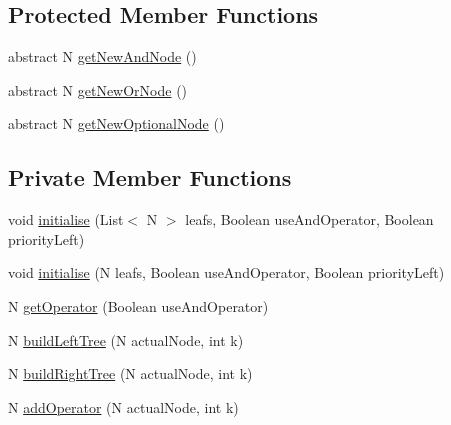 \subsection*{Protected Member Functions}
\begin{DoxyCompactItemize}
\item 
abstract N \hyperlink{classit_1_1emarolab_1_1cagg_1_1core_1_1PseudoBinaryNode_1_1PseudoBinaryTreeGenerator_3_01N_01extends_01PseudoBinaryNode_01_4_acda10a61fc91f76e47c9f49563facb58}{get\-New\-And\-Node} ()
\item 
abstract N \hyperlink{classit_1_1emarolab_1_1cagg_1_1core_1_1PseudoBinaryNode_1_1PseudoBinaryTreeGenerator_3_01N_01extends_01PseudoBinaryNode_01_4_ad040ce8e6b2f71fef3085d531810662a}{get\-New\-Or\-Node} ()
\item 
abstract N \hyperlink{classit_1_1emarolab_1_1cagg_1_1core_1_1PseudoBinaryNode_1_1PseudoBinaryTreeGenerator_3_01N_01extends_01PseudoBinaryNode_01_4_afbf62964b9e325ab04066b93ae0193f1}{get\-New\-Optional\-Node} ()
\end{DoxyCompactItemize}
\subsection*{Private Member Functions}
\begin{DoxyCompactItemize}
\item 
void \hyperlink{classit_1_1emarolab_1_1cagg_1_1core_1_1PseudoBinaryNode_1_1PseudoBinaryTreeGenerator_3_01N_01extends_01PseudoBinaryNode_01_4_a45f5619147f3f0d99121c67c72c3b3af}{initialise} (List$<$ N $>$ leafs, Boolean use\-And\-Operator, Boolean priority\-Left)
\item 
void \hyperlink{classit_1_1emarolab_1_1cagg_1_1core_1_1PseudoBinaryNode_1_1PseudoBinaryTreeGenerator_3_01N_01extends_01PseudoBinaryNode_01_4_adc79f9bbb248c0b5a116836affaa20b8}{initialise} (N leafs, Boolean use\-And\-Operator, Boolean priority\-Left)
\item 
N \hyperlink{classit_1_1emarolab_1_1cagg_1_1core_1_1PseudoBinaryNode_1_1PseudoBinaryTreeGenerator_3_01N_01extends_01PseudoBinaryNode_01_4_a8605ade19a0ffd011f6ef1c8496f1215}{get\-Operator} (Boolean use\-And\-Operator)
\item 
N \hyperlink{classit_1_1emarolab_1_1cagg_1_1core_1_1PseudoBinaryNode_1_1PseudoBinaryTreeGenerator_3_01N_01extends_01PseudoBinaryNode_01_4_a9a8843d16ae51f1d9c1573f60488f143}{build\-Left\-Tree} (N actual\-Node, int k)
\item 
N \hyperlink{classit_1_1emarolab_1_1cagg_1_1core_1_1PseudoBinaryNode_1_1PseudoBinaryTreeGenerator_3_01N_01extends_01PseudoBinaryNode_01_4_a8e31422ba0d9e1d5c1e9eceeefd48892}{build\-Right\-Tree} (N actual\-Node, int k)
\item 
N \hyperlink{classit_1_1emarolab_1_1cagg_1_1core_1_1PseudoBinaryNode_1_1PseudoBinaryTreeGenerator_3_01N_01extends_01PseudoBinaryNode_01_4_af40fd40f6f7b223449441ed627bb31e0}{add\-Operator} (N actual\-Node, int k)
\end{DoxyCompactItemize}
